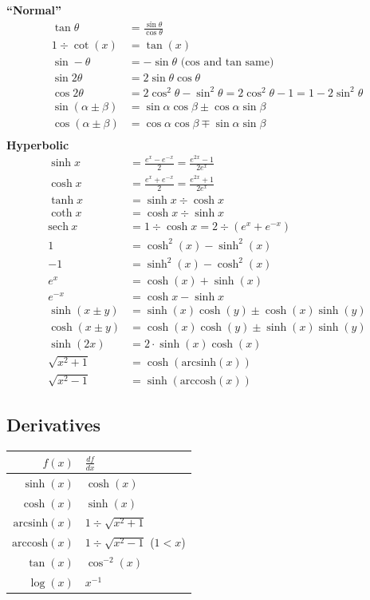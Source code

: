 \textbf{``Normal''}
\begin{align*}
    \tan\theta & = \frac{\sin\theta}{\cos\theta} \\
    1\div\cot(x) & = \tan(x) \\
    \sin -\theta & = -\sin\theta\text{ (cos and tan same)} \\
    \sin 2\theta & = 2\sin\theta\cos\theta \\
    \cos 2\theta & = 2\cos^2\theta - \sin^2\theta = 2\cos^2\theta - 1 = 1 - 2\sin^2\theta \\
    \sin(\alpha \pm \beta) & = \sin\alpha\cos\beta\pm\cos\alpha\sin\beta \\
    \cos(\alpha\pm\beta) & = \cos\alpha\cos\beta \mp \sin\alpha\sin\beta \\
\end{align*}
\textbf{Hyperbolic}
\begin{align*}
    \sinh x & = \frac{e^x - e^{-x}}{2}=\frac{e^{2x}-1}{2e^x} \\
    \cosh x & = \frac{e^x + e^{-x}}{2} = \frac{e^{2x}+1}{2e^x} \\
    \tanh x & = \sinh x \div \cosh x \\
    \coth x & = \cosh x \div \sinh x \\
    \mathrm{sech}\ x & = 1 \div \cosh x = 2 \div (e^x+e^{-x}) \\
    1 & = \cosh^2(x) - \sinh^2(x) \\
    -1 & = \sinh^2(x) - \cosh^2(x) \\
    e^x & = \cosh(x) + \sinh(x) \\
    e^{-x} & = \cosh x - \sinh x \\
    \sinh(x\pm y) & = \sinh(x)\cosh(y)\pm \cosh(x)\sinh(y) \\
    \cosh(x\pm y) & = \cosh(x)\cosh(y)\pm\sinh(x)\sinh(y) \\
    \sinh(2x) & = 2\cdot\sinh(x)\cosh(x) \\
    \sqrt{x^2 + 1} & = \cosh(\mathrm{arcsinh}(x)) \\
    \sqrt{x^2 - 1} & = \sinh(\mathrm{arccosh}(x))
\end{align*}

\subsection{Derivatives}
\begin{tabular}{r|l}
    $f(x)$                & $\frac{df}{dx}$                 \\
    \hline
    $\sinh(x)$            & $\cosh(x)$                      \\
    $\cosh(x)$            & $\sinh(x)$                      \\
    $\mathrm{arcsinh}(x)$ & $1 \div \sqrt{x^2+1}$           \\
    $\mathrm{arccosh}(x)$ & $1 \div \sqrt{x^2 - 1}$ ($1<x$) \\
    $\tan(x)$             & $\cos^{-2}(x)$                  \\
    $\log(x)$             & $x^{-1}$
\end{tabular}


